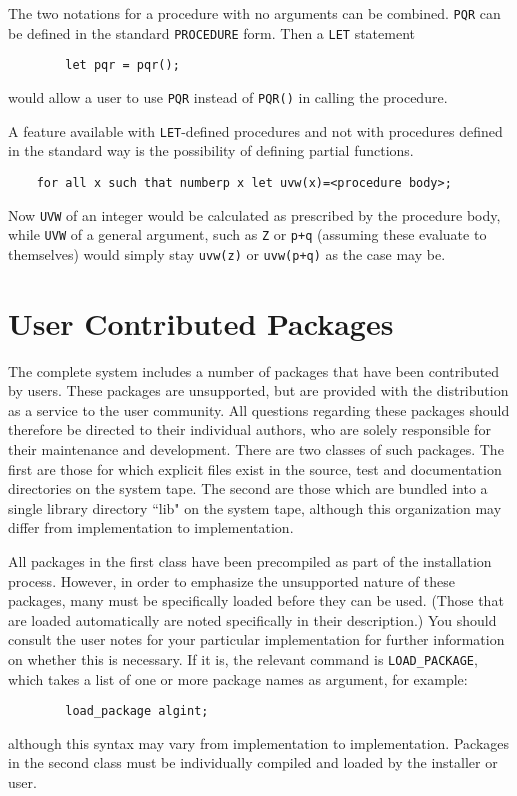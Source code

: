 The two notations for a procedure with no arguments can be combined. {\tt PQR}
can be defined in the standard {\tt PROCEDURE} form. Then a {\tt LET}
statement
\begin{verbatim}
        let pqr = pqr();
\end{verbatim}
would allow a user to use {\tt PQR} instead of {\tt PQR()} in calling the
procedure.

A feature available with {\tt LET}-defined procedures and not with procedures
defined in the standard way is the possibility of defining partial
functions. 
\begin{verbatim}
    for all x such that numberp x let uvw(x)=<procedure body>;
\end{verbatim}
Now {\tt UVW} of an integer would be calculated as prescribed by the procedure
body, while {\tt UVW} of a general argument, such as {\tt Z} or {\tt p+q}
(assuming these evaluate to themselves) would simply stay {\tt uvw(z)}
or {\tt uvw(p+q)} as the case may be.

\chapter{User Contributed Packages} 

The complete {\REDUCE} system includes a number of packages that have been
contributed by users.  These packages are unsupported, but are provided with
the {\REDUCE} distribution as a service to the user community.  All questions
regarding these packages should therefore be directed to their individual
authors, who are solely responsible for their maintenance and development.
There are two classes of such packages.  The first are those for which
explicit files exist in the source, test and documentation directories on the
system tape.  The second are those which are bundled into a single library
directory ``lib" on the system tape, although this organization may
differ from implementation to implementation.

All packages in the first class have been precompiled as part of the
installation process.  However, in order to emphasize the unsupported
nature of these packages, many must be specifically loaded before they can
be used. (Those that are loaded automatically are noted specifically in
their description.) You should consult the user notes for your particular
implementation for further information on whether this is necessary.  If
it is, the relevant command is {\tt LOAD\_PACKAGE}, 
which takes a list of one or more package names as argument, for example:
\begin{verbatim}
        load_package algint;
\end{verbatim}
although this syntax may vary from implementation to implementation.
Packages in the second class must be individually compiled and loaded by
the installer or user.

